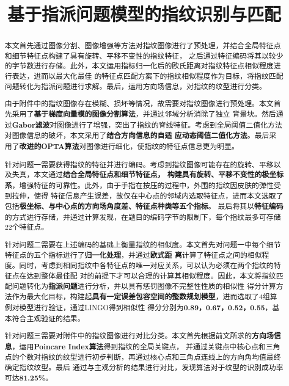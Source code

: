 \documentclass{whutmod}
\title{基于指派问题模型的指纹识别与匹配}
\begin{document}
\begin{spacing}{1.2}
	

\maketitle

\begin{abstract}\setlength{\parskip}{0.3\baselineskip}
本文首先通过图像分割、图像增强等方法对指纹图像进行了预处理，并结合全局特征点和细节特征点构建了具有旋转、平移不变性的指纹特征，
之后通过特征编码将其以较少的字节数进行存储。此外，本文运用指标归一化后的欧氏距离对指纹特征点相似程度进行表达，进而以最大化最佳
的特征点匹配方案下的指纹相似程度作为目标，将指纹匹配问题转化为指派问题进行求解。最后，运用方向场信息，对指纹的纹型进行分类。

由于附件中的指纹图像存在模糊、损坏等情况，故需要对指纹图像进行预处理。本文首先采用了\textbf{基于梯度向量模的图像分割算法}，并通过邻域分析消除了独立
背景块。然后通过\textbf{Gabor滤波}对图像进行了增强，突出了指纹的脊线特征。考虑到全局阈值二值化方法对图像信息的破坏，本文采用了\textbf{结合方向信息的自适
应动态阈值二值化方法}。最后采用了\textbf{改进的OPTA算法}对图像进行细化，使指纹的特征点信息更为明显。

针对问题一需要获得指纹的特征并进行编码。考虑到指纹图像可能存在的旋转、平移以及失真，本文通过\textbf{结合全局特征点和细节特征点，
构建具有旋转、平移不变性的极坐标系}，增强特征的可靠性。此外，由于手指在按压的过程中，外围的指纹因皮肤的弹性受到拉伸，使得
特征信息产生误差，故仅在中心点的邻域内选取特征点，进而本文选取了包括\textbf{极坐标、与中心点的方向场角度差、特征点种类等五个指标}。
最后将其以\textbf{特征编码}的方式进行存储，并通过计算发现，在题目的编码字节的限制下，每个指纹最多可存储22个特征点。

针对问题二需要在上述编码的基础上衡量指纹的相似度。本文首先对问题一中每个细节特征点的五个指标进行了\textbf{归一化处理}，并通过\textbf{欧式距
离}计算了特征点之间的相似程度。同时，考虑到相同指纹中各特征点的唯一对应关系，可以认为必须在两个指纹的特征点在达到整体最佳配
对的前提下才可以合理的计算其相似程度。因此，本文将指纹匹配问题转化为\textbf{指派问题}进行分析，并以具有惩罚图像不完整性性质的相似性
得分计算方法作为最大化目标，构建起\textbf{具有一定误差包容空间的整数规划模型}，进而选取了4组算例对模型进行验证，通过LINGO得到相似性
得分分别为\textbf{0.89，0.67，0.52，0.55}，基本符合主观验证的结果。

针对问题三需要对附件中的指纹图像进行对比分类。本文首先根据前文所求的\textbf{方向场信息}，运用\textbf{Poincare Index算法}得到指纹的全局关键点，
并通过关键点中核心点和三角点的个数对指纹的纹型进行初步判断，再通过核心点和三角点连线上的方向角均值最终确定指纹纹型。最后
通过与主观分析的结果进行对比，发现算法对于纹型的识别成功率可达\textbf{81.25\%}。


\end{abstract}
\end{spacing}
\end{document}
